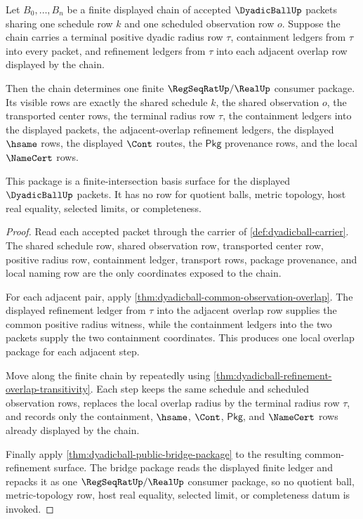 \begin{theorem}
\label{thm:dyadicball-finite-intersection-basis-package}
Let $B_0,\ldots,B_n$ be a finite displayed chain of accepted
$\DyadicBallUp$ packets sharing one schedule row $k$ and one scheduled
observation row $o$. Suppose the chain carries a terminal positive dyadic
radius row $\tau$, containment ledgers from $\tau$ into every packet, and
refinement ledgers from $\tau$ into each adjacent overlap row displayed by the
chain.

Then the chain determines one finite $\RegSeqRatUp/\RealUp$ consumer package.
Its visible rows are exactly the shared schedule $k$, the shared observation
$o$, the transported center rows, the terminal radius row $\tau$, the
containment ledgers into the displayed packets, the adjacent-overlap
refinement ledgers, the displayed $\hsame$ rows, the displayed $\Cont$ routes,
the $\mathsf{Pkg}$ provenance rows, and the local $\NameCert$ rows.

This package is a finite-intersection basis surface for the displayed
$\DyadicBallUp$ packets. It has no row for quotient balls, metric topology,
host real equality, selected limits, or completeness.
\end{theorem}
\begin{proof}
Read each accepted packet through the carrier of
\autoref{def:dyadicball-carrier}. The shared schedule row, shared observation
row, transported center row, positive radius row, containment ledger,
transport rows, package provenance, and local naming row are the only
coordinates exposed to the chain.

For each adjacent pair, apply
\autoref{thm:dyadicball-common-observation-overlap}. The displayed refinement
ledger from $\tau$ into the adjacent overlap row supplies the common positive
radius witness, while the containment ledgers into the two packets supply the
two containment coordinates. This produces one local overlap package for each
adjacent step.

Move along the finite chain by repeatedly using
\autoref{thm:dyadicball-refinement-overlap-transitivity}. Each step keeps the
same schedule and scheduled observation rows, replaces the local overlap
radius by the terminal radius row $\tau$, and records only the containment,
$\hsame$, $\Cont$, $\mathsf{Pkg}$, and $\NameCert$ rows already displayed by
the chain.

Finally apply \autoref{thm:dyadicball-public-bridge-package} to the resulting
common-refinement surface. The bridge package reads the displayed finite
ledger and repacks it as one $\RegSeqRatUp/\RealUp$ consumer package, so no
quotient ball, metric-topology row, host real equality, selected limit, or
completeness datum is invoked.
\end{proof}

